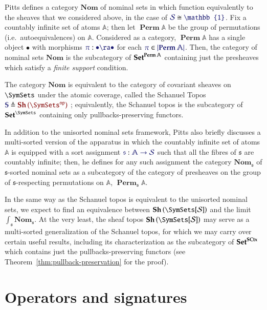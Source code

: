 \documentclass[11pt]{article}
\theoremstyle{definition}
\theoremstyle{remark}
\numberwithin{equation}{section}
\newcommand\Sheaves[1]{\mathbf{Sh}\left(#1\right)}
\newcommand\SCtxSite{\SymSets[\Sorts]}
\DeclareMathOperator{\Perm}{\mathbf{Perm}}
\begin{document}
Pitts defines a category $\mathbf{Nom}$ of nominal sets in \cite{pitts:2013}
which function equivalently to the sheaves that we considered above, in the
case of $\IMode{\Sorts}\cong\IMode{\mathbb{1}}$. Fix a countably infinite set
of atoms $\mathbb{A}$; then let $\Perm\mathbb{A}$ be the group of permutations
(i.e.\ autoequivalences) on $\mathbb{A}$.  Considered as a category,
$\Perm\mathbb{A}$ has a single object $\bullet$ with morphisms
$\Of{\pi}{\bullet\ra\bullet}$ for each $\Member{\pi}{\Dom{\Perm\mathbb{A}}}$.
Then, the category of nominal sets $\mathbf{Nom}$ is the subcategory of
$\Sets^{\Perm\mathbb{A}}$ containing just the presheaves which satisfy a
\emph{finite support} condition.

The category $\mathbf{Nom}$ is equivalent to the category of covariant sheaves
on $\SymSets$ under the atomic coverage, called the Schanuel Topos
$\Define{\mathbb{S}}{\Sheaves{\OpCat{\SymSets}}}$ \cite{pitts:2013,
fiore-staton:2006}; equivalently, the Schanuel topos is the subcategory of
$\Sets^\SymSets$ containing only pullbacks-preserving functors.

In addition to the unisorted nominal sets framework, Pitts also briefly
discusses a multi-sorted version of the apparatus in which the countably
infinite set of atoms $\mathbb{A}$ is equipped with a sort assignment
$\Of{\mathfrak{s}}{\mathbb{A}\to\Sorts}$ such that all the fibres of
$\mathfrak{s}$ are countably infinite; then, he defines for any such assignment
the category $\mathbf{Nom}_\mathfrak{s}$ of $\mathfrak{s}$-sorted nominal sets
as a subcategory of the category of presheaves on the group of
$\mathfrak{s}$-respecting permutations on $\mathbb{A}$,
$\Perm_\mathfrak{s}\mathbb{A}$.

In the same way as the Schanuel topos is equivalent to the unisorted nominal
sets, we expect to find an equivalence between $\Sheaves{\SCtxSite}$ and the
limit $\int_{\mathfrak{s}}\mathbf{Nom}_\mathfrak{s}$. At the very least, the
sheaf topos $\Sheaves{\SCtxSite}$ may serve as a multi-sorted generalization of
the Schanuel topos, for which we may carry over certain useful results,
including its characterization as the subcategory of $\mathbf{Set}^{\mathbf{SCtx}}$ which
contains just the pullbacks-preserving functors (see
Theorem~\ref{thm:pullback-preservation} for the proof).


\section{Operators and signatures}
\end{document}

